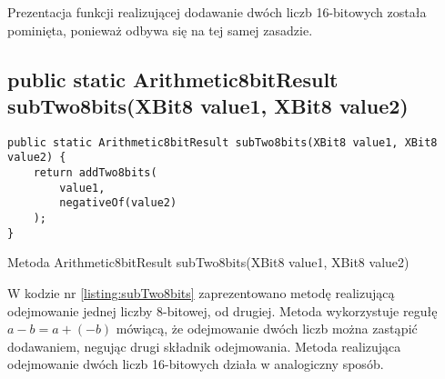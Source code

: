 	Prezentacja funkcji realizującej dodawanie dwóch liczb 16-bitowych została pominięta, ponieważ odbywa się na tej samej zasadzie.
	
	\subsection{public static Arithmetic8bitResult subTwo8bits(XBit8 value1, XBit8 value2)}
	\begin{listing}[h]
		\begin{verbatim}
public static Arithmetic8bitResult subTwo8bits(XBit8 value1, XBit8 value2) {
	return addTwo8bits(
		value1,
		negativeOf(value2)
	);
}
		\end{verbatim}
		\caption{Metoda Arithmetic8bitResult subTwo8bits(XBit8 value1, XBit8 value2)}
		\label{listing:subTwo8bits}
	\end{listing}
	W kodzie nr \ref{listing:subTwo8bits} zaprezentowano metodę realizującą odejmowanie jednej liczby 8-bitowej, od drugiej. Metoda wykorzystuje regułę 
	$ a - b = a+(-b) $ mówiącą, że odejmowanie dwóch liczb można zastąpić dodawaniem, negując drugi składnik odejmowania. 
	Metoda realizująca odejmowanie dwóch liczb 16-bitowych działa w analogiczny sposób.
	
	
	
	
	




	
	
	